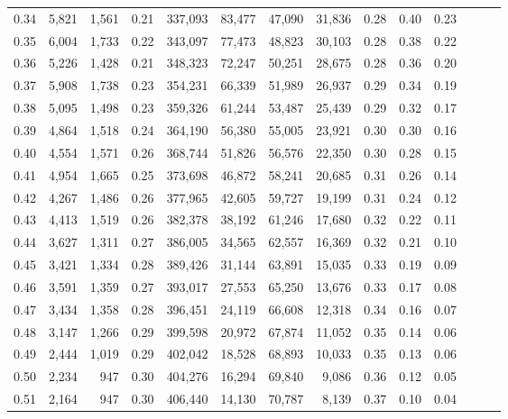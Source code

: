 \begin{tabular}{rrrrrrrrrrrrrr}
0.34 &   5,821 &  1,561 &  0.21 &  337,093 &   83,477 &  47,090 &  31,836 &  0.28 &  0.40 &      0.23 \\
0.35 &   6,004 &  1,733 &  0.22 &  343,097 &   77,473 &  48,823 &  30,103 &  0.28 &  0.38 &      0.22 \\
0.36 &   5,226 &  1,428 &  0.21 &  348,323 &   72,247 &  50,251 &  28,675 &  0.28 &  0.36 &      0.20 \\
0.37 &   5,908 &  1,738 &  0.23 &  354,231 &   66,339 &  51,989 &  26,937 &  0.29 &  0.34 &      0.19 \\
0.38 &   5,095 &  1,498 &  0.23 &  359,326 &   61,244 &  53,487 &  25,439 &  0.29 &  0.32 &      0.17 \\
0.39 &   4,864 &  1,518 &  0.24 &  364,190 &   56,380 &  55,005 &  23,921 &  0.30 &  0.30 &      0.16 \\
0.40 &   4,554 &  1,571 &  0.26 &  368,744 &   51,826 &  56,576 &  22,350 &  0.30 &  0.28 &      0.15 \\
0.41 &   4,954 &  1,665 &  0.25 &  373,698 &   46,872 &  58,241 &  20,685 &  0.31 &  0.26 &      0.14 \\
0.42 &   4,267 &  1,486 &  0.26 &  377,965 &   42,605 &  59,727 &  19,199 &  0.31 &  0.24 &      0.12 \\
0.43 &   4,413 &  1,519 &  0.26 &  382,378 &   38,192 &  61,246 &  17,680 &  0.32 &  0.22 &      0.11 \\
0.44 &   3,627 &  1,311 &  0.27 &  386,005 &   34,565 &  62,557 &  16,369 &  0.32 &  0.21 &      0.10 \\
0.45 &   3,421 &  1,334 &  0.28 &  389,426 &   31,144 &  63,891 &  15,035 &  0.33 &  0.19 &      0.09 \\
0.46 &   3,591 &  1,359 &  0.27 &  393,017 &   27,553 &  65,250 &  13,676 &  0.33 &  0.17 &      0.08 \\
0.47 &   3,434 &  1,358 &  0.28 &  396,451 &   24,119 &  66,608 &  12,318 &  0.34 &  0.16 &      0.07 \\
0.48 &   3,147 &  1,266 &  0.29 &  399,598 &   20,972 &  67,874 &  11,052 &  0.35 &  0.14 &      0.06 \\
0.49 &   2,444 &  1,019 &  0.29 &  402,042 &   18,528 &  68,893 &  10,033 &  0.35 &  0.13 &      0.06 \\
0.50 &   2,234 &    947 &  0.30 &  404,276 &   16,294 &  69,840 &   9,086 &  0.36 &  0.12 &      0.05 \\
0.51 &   2,164 &    947 &  0.30 &  406,440 &   14,130 &  70,787 &   8,139 &  0.37 &  0.10 &      0.04 \\

\end{tabular}
